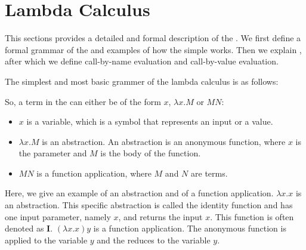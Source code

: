 \chapter{Lambda Calculus}
This sections provides a detailed and formal description of the \lc. We first define a formal grammar of the \lc and examples of how the simple \lc works.
Then we explain \br, after which we define call-by-name evaluation and call-by-value evaluation.


The simplest and most basic grammer of the lambda calculus is as follows:

\vspace{10pt}
\begin{grammar}{
	}
\end{grammar}

\vspace{10pt}
So, a term in the \lc can either be of the form $x$, $\lambda x.M$ or $M N$:
\begin{itemize}[noitemsep]
	\item $x$ is a variable, which is a symbol that represents an input or a value.
	\item $\lambda x.M$ is an abstraction. An abstraction is an anonymous function, where $x$ is the parameter and $M$ is the body of the function.
	\item $M N$ is a function application, where $M$ and $N$ are terms.
\end{itemize}

Here, we give an example of an abstraction and of a function application. $\lambda x. x$ is an abstraction. This specific abstraction is called the identity function and has one input parameter, namely $x$, and returns the input $x$.
This function is often denoted as $\mathbf{I}$. $(\lambda x. x)y$ is a function application. The anonymous function is applied to the variable $y$ and the \lterm reduces to the variable $y$.

